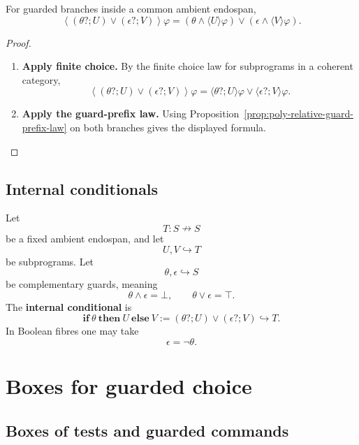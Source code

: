 \begin{proposition}
\label{prop:poly-relative-guarded-choice-diamond}
For guarded branches inside a common ambient endospan,
\[
\left\langle
(\theta?;U)\vee(\epsilon?;V)
\right\rangle\varphi
=
(\theta\wedge\langle U\rangle\varphi)
\vee
(\epsilon\wedge\langle V\rangle\varphi).
\]
\end{proposition}

\begin{proof}
\leavevmode
\begin{enumerate}
\item \textbf{Apply finite choice.}
By the finite choice law for subprograms in a coherent category,
\[
\left\langle
(\theta?;U)\vee(\epsilon?;V)
\right\rangle\varphi
=
\langle\theta?;U\rangle\varphi
\vee
\langle\epsilon?;V\rangle\varphi.
\]

\item \textbf{Apply the guard-prefix law.}
Using Proposition~\ref{prop:poly-relative-guard-prefix-law} on both branches
gives the displayed formula.
\end{enumerate}
\end{proof}

\subsection{Internal conditionals}
\label{subsec:poly-relative-conditionals}

\begin{definition}
\label{def:poly-relative-conditional}
Let
\[
T:S\nrightarrow S
\]
be a fixed ambient endospan, and let
\[
U,V\hookrightarrow T
\]
be subprograms.  Let
\[
\theta,\epsilon\hookrightarrow S
\]
be complementary guards, meaning
\[
\theta\wedge\epsilon=\bot,
\qquad
\theta\vee\epsilon=\top.
\]
The \textbf{internal conditional} is
\[
\mathbf{if}\ \theta\ \mathbf{then}\ U\ \mathbf{else}\ V
:=
(\theta?;U)\vee(\epsilon?;V)
\hookrightarrow T.
\]
In Boolean fibres one may take
\[
\epsilon=\neg\theta.
\]
\end{definition}


\section{Boxes for guarded choice}
\label{sec:poly-relative-boxes-choice}

\subsection{Boxes of tests and guarded commands}
\label{subsec:poly-relative-boxes-tests-guarded}

